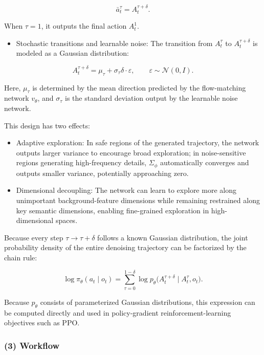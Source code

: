 \[
\bar{a}_t^\tau=A_t^{\tau+\delta}.
\]

When \(\tau=1\), it outputs the final action \(A_t^1\).

\begin{itemize}
\tightlist
\item
{}
  Stochastic transitions and learnable noise: The transition from \(A_t^\tau\) to \(A_t^{\tau+\delta}\) is modeled as a Gaussian distribution:
\end{itemize}

\[
A_t^{\tau+\delta}=\mu_\tau+\sigma_\tau\delta\cdot\varepsilon,
\qquad \varepsilon\sim\mathcal{N}(0,I).
\]

Here, \(\mu_\tau\) is determined by the mean direction predicted by the flow-matching network \(v_\theta\), and \(\sigma_\tau\) is the standard deviation output by the learnable noise network.

This design has two effects:

\begin{itemize}
\tightlist
\item
  Adaptive exploration: In safe regions of the generated trajectory, the network outputs larger variance to encourage broad exploration; in noise-sensitive regions generating high-frequency details, \(\Sigma_\phi\) automatically converges and outputs smaller variance, potentially approaching zero.
\item
  Dimensional decoupling: The network can learn to explore more along unimportant background-feature dimensions while remaining restrained along key semantic dimensions, enabling fine-grained exploration in high-dimensional spaces.
\end{itemize}

Because every step \(\tau\to\tau+\delta\) follows a known Gaussian distribution, the joint probability density of the entire denoising trajectory can be factorized by the chain rule:

\[
\log\pi_\theta(a_t\mid o_t)=\sum_{\tau=0}^{1-\delta}\log p_\theta
\bigl(A_t^{\tau+\delta}\mid A_t^\tau,o_t\bigr).
\]

Because \(p_\theta\) consists of parameterized Gaussian distributions, this expression can be computed directly and used in policy-gradient reinforcement-learning objectives such as PPO.

\hypertarget{workflow-3}{%
\subsubsection{(3) Workflow}\label{workflow-3}}

